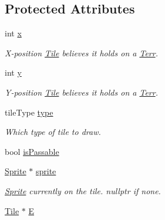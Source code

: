 \subsection*{Protected Attributes}
\begin{DoxyCompactItemize}
\item 
int \hyperlink{class_tile_a47b5eb2072d4b1978923a480043899c9}{x}\hypertarget{class_tile_a47b5eb2072d4b1978923a480043899c9}{}\label{class_tile_a47b5eb2072d4b1978923a480043899c9}

\begin{DoxyCompactList}\small\item\em X-\/position \hyperlink{class_tile}{Tile} believes it holds on a \hyperlink{class_terr}{Terr}. \end{DoxyCompactList}\item 
int \hyperlink{class_tile_a2d87d8813151af6bbd60811964f047a8}{y}\hypertarget{class_tile_a2d87d8813151af6bbd60811964f047a8}{}\label{class_tile_a2d87d8813151af6bbd60811964f047a8}

\begin{DoxyCompactList}\small\item\em Y-\/position \hyperlink{class_tile}{Tile} believes it holds on a \hyperlink{class_terr}{Terr}. \end{DoxyCompactList}\item 
tile\+Type \hyperlink{class_tile_a5aa7ae6350675967edf46400c486a412}{type}\hypertarget{class_tile_a5aa7ae6350675967edf46400c486a412}{}\label{class_tile_a5aa7ae6350675967edf46400c486a412}

\begin{DoxyCompactList}\small\item\em Which type of tile to draw. \end{DoxyCompactList}\item 
bool \hyperlink{class_tile_afa72b458d549b9533f058e2d2fad0f81}{is\+Passable}
\item 
\hyperlink{class_sprite}{Sprite} $\ast$ \hyperlink{class_tile_af768c5b838f49de5d626880c88b3d515}{sprite}\hypertarget{class_tile_af768c5b838f49de5d626880c88b3d515}{}\label{class_tile_af768c5b838f49de5d626880c88b3d515}

\begin{DoxyCompactList}\small\item\em \hyperlink{class_sprite}{Sprite} currently on the tile. nullptr if none. \end{DoxyCompactList}\item 
\hyperlink{class_tile}{Tile} $\ast$ \hyperlink{class_tile_a0d63c88d4136aecedcb2756d20615b89}{E}\hypertarget{class_tile_a0d63c88d4136aecedcb2756d20615b89}{}\label{class_tile_a0d63c88d4136aecedcb2756d20615b89}


\end{DoxyCompactItemize}
